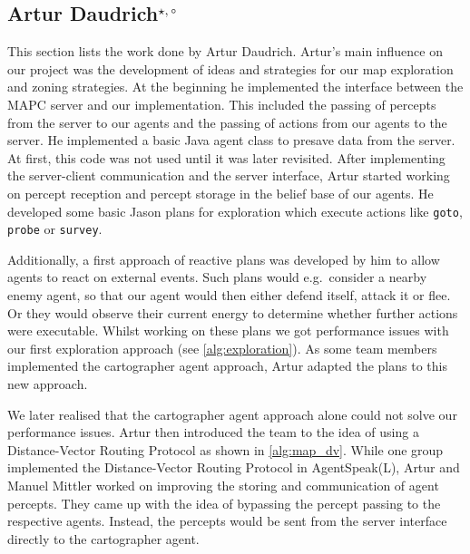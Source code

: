 \subsection[Artur Daudrich]{Artur Daudrich$^{\star,\circ}$}
This section lists the work done by Artur Daudrich.
Artur's main influence on our project was the development of ideas and strategies for our map exploration and zoning strategies.
At the beginning he implemented the interface between the MAPC server and our implementation.
This included the passing of percepts from the server to our agents and the passing of actions from our agents to the server.
He implemented a basic Java agent class to presave data from the server.
At first, this code was not used until it was later revisited.
After implementing the server-client communication and the server interface, Artur started working on percept reception and percept storage in the belief base of our agents.
He developed some basic Jason plans for exploration which execute actions like \texttt{goto}, \texttt{probe} or \texttt{survey}.

Additionally, a first approach of reactive plans was developed by him to allow agents to react on external events.
Such plans would e.g.\ consider a nearby enemy agent, so that our agent would then either defend itself, attack it or flee.
Or they would observe their current energy to determine whether further actions were executable.
Whilst working on these plans we got performance issues with our first exploration approach (see \autoref{alg:exploration}).
As some team members implemented the cartographer agent approach, Artur adapted the plans to this new approach.

We later realised that the cartographer agent approach alone could not solve our performance issues.
Artur then introduced the team to the idea of using a Distance-Vector Routing Protocol as shown in \autoref{alg:map_dv}.
While one group implemented the Distance-Vector Routing Protocol in AgentSpeak(L), Artur and Manuel Mittler worked on improving the storing and communication of agent percepts.
They came up with the idea of bypassing the percept passing to the respective agents.
Instead, the percepts would be sent from the server interface directly to the cartographer agent.

